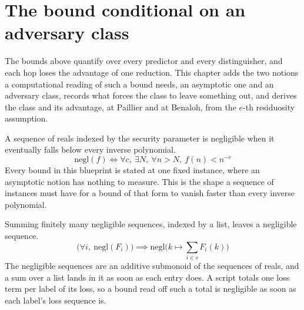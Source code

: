 \chapter{The bound conditional on an adversary class}
\label{ch:adversary_class}

The bounds above quantify over every predictor and every distinguisher, and
each hop loses the advantage of one reduction. This chapter adds the two
notions a computational reading of such a bound needs, an asymptotic one and an
adversary class, records what forces the class to leave something out, and
derives the class and its advantage, at Paillier and at Benaloh, from the
$e$-th residuosity assumption.

\begin{definition}
  \label{def:negligible_fun}
  \rocqok
  A sequence of reals indexed by the security parameter is negligible when it
  eventually falls below every inverse polynomial.
  \[ \mathrm{negl}(f) \iff \forall c,\ \exists N,\ \forall n > N,\
       f(n) < n^{-c} \]
  Every bound in this blueprint is stated at one fixed instance, where an
  asymptotic notion has nothing to measure. This is the shape a sequence of
  instances must have for a bound of that form to vanish faster than every
  inverse polynomial.
\end{definition}

\begin{lemma}
  \label{lem:negligible_fun_sum}
  \rocqok
  Summing finitely many negligible sequences, indexed by a list, leaves a
  negligible sequence.
  \[ \big(\forall i,\ \mathrm{negl}(F_i)\big) \implies
     \mathrm{negl}\Big(k \mapsto \sum_{i \in s} F_i(k)\Big) \]
  The negligible sequences are an additive submonoid of the sequences of
  reals, and a sum over a list lands in it as soon as each entry does. A
  script totals one loss term per label of its loss, so a bound read off such
  a total is negligible as soon as each label's loss sequence is.
\end{lemma}

